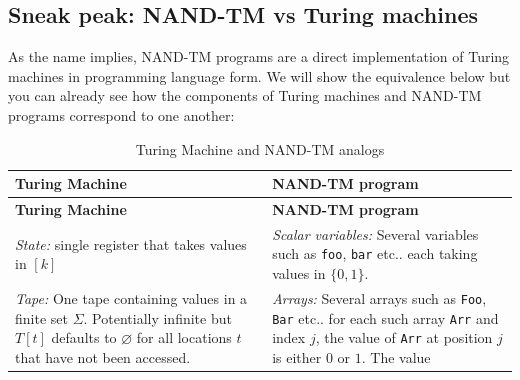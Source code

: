 \subsection{Sneak peak: NAND-TM vs Turing
machines}\label{Sneak-peak-NAND-TM-vs-Tur}

As the name implies, NAND-TM programs are a direct implementation of
Turing machines in programming language form. We will show the
equivalence below but you can already see how the components of Turing
machines and NAND-TM programs correspond to one another:

\begin{longtable}[]{@{}ll@{}}
\caption{Turing Machine and NAND-TM analogs}\tabularnewline
\toprule
\begin{minipage}[b]{0.41\columnwidth}\raggedright
\textbf{Turing Machine}\strut
\end{minipage} & \begin{minipage}[b]{0.53\columnwidth}\raggedright
\textbf{NAND-TM program}\strut
\end{minipage}\tabularnewline
\midrule
\endfirsthead
\toprule
\begin{minipage}[b]{0.41\columnwidth}\raggedright
\textbf{Turing Machine}\strut
\end{minipage} & \begin{minipage}[b]{0.53\columnwidth}\raggedright
\textbf{NAND-TM program}\strut
\end{minipage}\tabularnewline
\midrule
\endhead
\begin{minipage}[t]{0.41\columnwidth}\raggedright
\emph{State:} single register that takes values in \([k]\)\strut
\end{minipage} & \begin{minipage}[t]{0.53\columnwidth}\raggedright
\emph{Scalar variables:} Several variables such as \texttt{foo},
\texttt{bar} etc.. each taking values in \(\{0,1\}\).\strut
\end{minipage}\tabularnewline
\begin{minipage}[t]{0.41\columnwidth}\raggedright
\emph{Tape:} One tape containing values in a finite set \(\Sigma\).
Potentially infinite but \(T[t]\) defaults to \(\varnothing\) for all
locations \(t\) that have not been accessed.\strut
\end{minipage} & \begin{minipage}[t]{0.53\columnwidth}\raggedright
\emph{Arrays:} Several arrays such as \texttt{Foo}, \texttt{Bar} etc..
for each such array \texttt{Arr} and index \(j\), the value of
\texttt{Arr} at position \(j\) is either \(0\) or \(1\). The value

\end{minipage}
\end{longtable}
